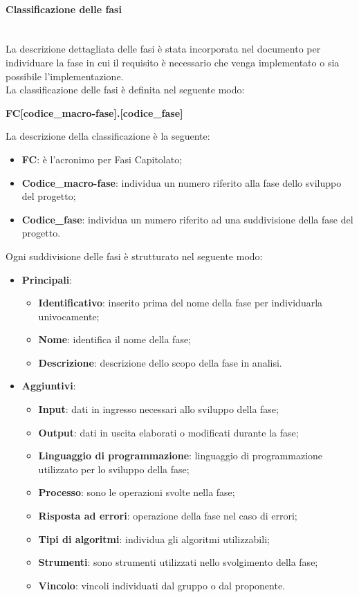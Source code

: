 \paragraph{Classificazione delle fasi}\label{2.2.3.1.6}\mbox{}\\%
La descrizione dettagliata delle fasi è stata incorporata nel documento per individuare la fase in cui il requisito è necessario che venga implementato o sia possibile l'implementazione.\\
La classificazione delle fasi è definita nel seguente modo:
\begin{center}
	\textbf{FC[codice\_macro-fase].[codice\_fase]}
\end{center}
La descrizione della classificazione è la seguente:
\begin{itemize}
	\item \textbf{FC}: è l'acronimo per Fasi Capitolato;
	\item \textbf{Codice\_macro-fase}: individua un numero riferito alla fase dello sviluppo del progetto;
	\item \textbf{Codice\_fase}: individua un numero riferito ad una suddivisione della fase del progetto.
\end{itemize}
Ogni suddivisione delle fasi è strutturato nel seguente modo:
\begin{itemize}
	\item \textbf{Principali}:
	\begin{itemize}
		\item \textbf{Identificativo}: inserito prima del nome della fase per individuarla univocamente;
		\item \textbf{Nome}: identifica il nome della fase;
		\item \textbf{Descrizione}: descrizione dello scopo della fase in analisi.
	\end{itemize}
	\item \textbf{Aggiuntivi}:
\begin{itemize}
	\item \textbf{Input}: dati in ingresso necessari allo sviluppo della fase;
	\item \textbf{Output}: dati in uscita elaborati o modificati durante la fase;
	\item \textbf{Linguaggio di programmazione}: linguaggio di programmazione utilizzato per lo sviluppo della fase;
	\item \textbf{Processo}: sono le operazioni svolte nella fase;
	\item \textbf{Risposta ad errori}: operazione della fase nel caso di errori;
	\item \textbf{Tipi di algoritmi}: individua gli algoritmi utilizzabili;
	\item \textbf{Strumenti}: sono strumenti utilizzati nello svolgimento della fase;
	\item \textbf{Vincolo}: vincoli individuati dal gruppo o dal proponente.
\end{itemize}
\end{itemize}
